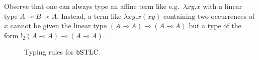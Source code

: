Observe that one can always type an affine term like e.g.~$\lambda xy.x$ with a linear type $A\multimap B\multimap A$. Instead, a term like $\lambda xy.x(xy)$ containing two occurrences of $x$ cannot be given the linear type $(A\multimap A)\multimap (A\multimap A)$ but a type of the form
$!_{2}(A\multimap A)\multimap (A\multimap A)$. 







\begin{figure}
\caption{Typing rules for $\mathsf b\mathrm{STLC}$.}
\label{fig:fuzz}
\end{figure}





